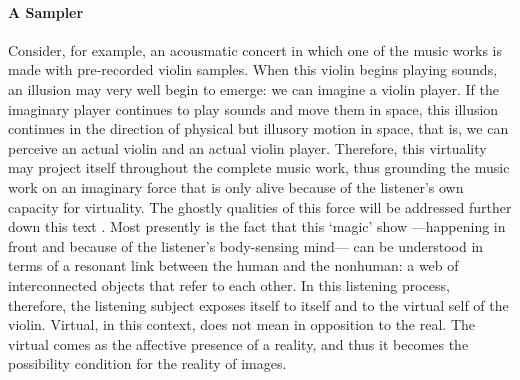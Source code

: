 \paragraph{A Sampler}
Consider, for example, an acousmatic concert in which one of the music works is made with pre-recorded violin samples. When this violin begins playing sounds, an illusion may very well begin to emerge: we can imagine a violin player. If the imaginary player continues to play sounds and move them in space, this illusion continues in the direction of physical but illusory motion in space, that is, we can perceive an actual violin and an actual violin player. Therefore, this virtuality may project itself throughout the complete music work, thus grounding the music work on an imaginary force that is only alive because of the listener's own capacity for virtuality. The ghostly qualities of this force will be addressed further down this text . Most presently is the fact that this `magic' show ---happening in front and because of the listener's body-sensing mind--- can be understood in terms of a resonant link between the human and the nonhuman: a web of interconnected objects that refer to each other. In this listening process, therefore, the listening subject exposes itself to itself and to the virtual self of the violin. Virtual, in this context, does not mean in opposition to the real. The virtual comes as the affective presence of a reality, and thus it becomes the possibility condition for the reality of images. 

